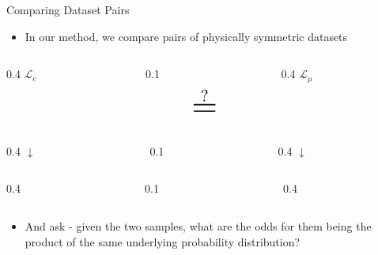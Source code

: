 \documentclass[notheorems]{beamer}
\begin{document}
\begin{frame}{Comparing Dataset Pairs}
    \begin{itemize}
        \item In our method, we compare pairs of physically symmetric datasets
    \end{itemize}
    \begin{center}
    \begin{columns}[c]
        \begin{column}{0.4\textwidth}
            \centering
            \Huge $\mathcal{L}_e$
        \end{column}
        \begin{column}{0.1\textwidth}
            \centering \[
                \overset{\makebox[0pt][c]{\scalebox{1.5}{?}}}{\scalebox{3}{$=$}}
            \]
        \end{column}
        \begin{column}{0.4\textwidth}
            \centering
            \Huge $\mathcal{L}_\mu$
        \end{column}
    \end{columns}
    \vspace{0.3cm}
    \begin{columns}[c]
        \begin{column}{0.4\textwidth}
            \centering
            \Huge $\downarrow$
        \end{column}
        \begin{column}{0.1\textwidth}
        \end{column}
        \begin{column}{0.4\textwidth}
            \centering
            \Huge $\downarrow$
        \end{column}
    \end{columns}
    \vspace{0.3cm}
    \begin{columns}[c]
        \begin{column}{0.4\textwidth}
            \centering
        \end{column}
        \begin{column}{0.1\textwidth}    
        \end{column}
        \begin{column}{0.4\textwidth}
            \centering
        \end{column}
    \end{columns}
    \end{center}
    \begin{itemize}
        \item And ask - given the two samples, what are the odds for them being the product of the same underlying probability distribution?
    \end{itemize}
\end{frame}
\end{document}
